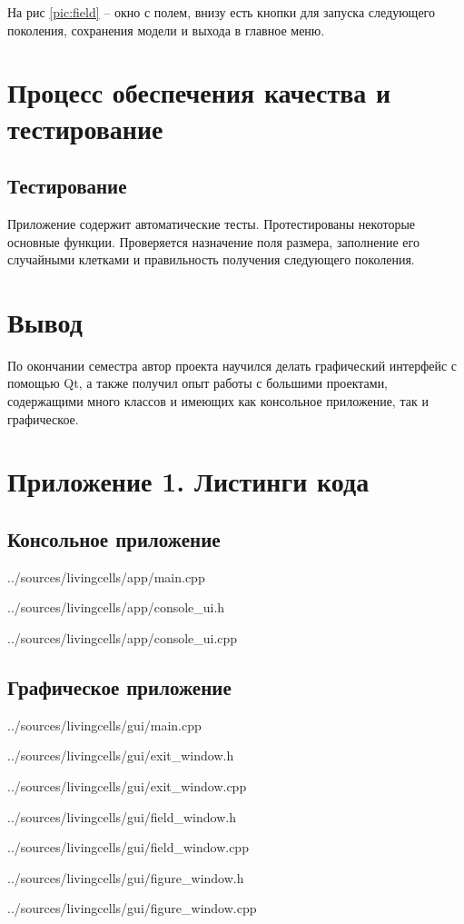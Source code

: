 \documentclass[a4paper]{article}
\begin{document}
На рис \ref{pic:field} – окно с полем, внизу есть кнопки для запуска следующего поколения, сохранения модели и выхода в главное меню.

\section{Процесс обеспечения качества и тестирование}
\subsection{Тестирование}
Приложение содержит автоматические тесты. Протестированы некоторые основные функции. Проверяется назначение поля размера, заполнение его случайными клетками и правильность получения следующего поколения.

\section{Вывод}
По окончании семестра автор проекта научился делать графический интерфейс с помощью Qt, а также получил опыт работы с большими проектами, содержащими много классов и имеющих как консольное приложение, так и графическое.

\section{Приложение 1. Листинги кода}
\subsection{Консольное приложение}

{../sources/livingcells/app/main.cpp}
\newpage


{../sources/livingcells/app/console_ui.h}

{../sources/livingcells/app/console_ui.cpp}
\newpage

\subsection{Графическое приложение}

{../sources/livingcells/gui/main.cpp}
\newpage


{../sources/livingcells/gui/exit_window.h}

{../sources/livingcells/gui/exit_window.cpp}
\newpage


{../sources/livingcells/gui/field_window.h}

{../sources/livingcells/gui/field_window.cpp}
\newpage


{../sources/livingcells/gui/figure_window.h}

{../sources/livingcells/gui/figure_window.cpp}
\newpage
\end{document}
